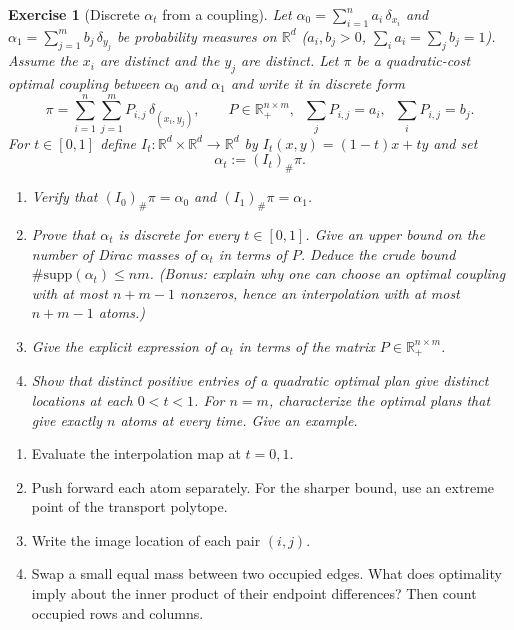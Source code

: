 \documentclass[11pt,a4paper]{article}
\theoremstyle{exostyle}
\newtheorem{exercise}{Exercise}
\newcommand{\R}{\mathbb{R}}
\newcommand{\push}{\#}
\begin{document}
\begin{exercise}[Discrete $\alpha_t$ from a coupling]\label{ex:discrete-interp}
Let $\alpha_0=\sum_{i=1}^n a_i\,\delta_{x_i}$ and $\alpha_1=\sum_{j=1}^m b_j\,\delta_{y_j}$ be probability measures on $\R^d$ ($a_i,b_j>0$, $\sum_i a_i=\sum_j b_j=1$).
Assume the $x_i$ are distinct and the $y_j$ are distinct. Let $\pi$ be a quadratic-cost optimal coupling between $\alpha_0$ and $\alpha_1$ and write it in discrete form
\[
\pi=\sum_{i=1}^n\sum_{j=1}^m P_{i,j}\,\delta_{(x_i,y_j)},\qquad
P\in\R^{n\times m}_+,\;\; \sum_j P_{i,j}=a_i,\;\; \sum_i P_{i,j}=b_j.
\]
For $t\in[0,1]$ define $I_t:\R^d\times\R^d\to\R^d$ by $I_t(x,y)=(1-t)x+ty$ and set
\[
\alpha_t:=(I_t)_{\push}\pi.
\]
\begin{enumerate}[label=(\alph*), itemsep=4pt]
\item Verify that $(I_0)_{\push}\pi=\alpha_0$ and $(I_1)_{\push}\pi=\alpha_1$.
\item Prove that $\alpha_t$ is discrete for every $t\in[0,1]$. Give an upper bound on the number of Dirac masses of $\alpha_t$ in terms of $P$. Deduce the crude bound $\#\mathrm{supp}(\alpha_t)\le nm$. (Bonus: explain why one can choose an \emph{optimal} coupling with at most $n+m-1$ nonzeros, hence an interpolation with at most $n+m-1$ atoms.)
\item Give the explicit expression of $\alpha_t$ in terms of the matrix $P\in\R^{n\times m}_+$.
\item Show that distinct positive entries of a quadratic optimal plan give distinct locations at each $0<t<1$. For $n=m$, characterize the optimal plans that give exactly $n$ atoms at every time. Give an example.
\end{enumerate}
\end{exercise}
\begin{hints}
\begin{enumerate}[label=(\alph*)]\item Evaluate the interpolation map at $t=0,1$.\item Push forward each atom separately. For the sharper bound, use an extreme point of the transport polytope.\item Write the image location of each pair $(i,j)$.\item Swap a small equal mass between two occupied edges. What does optimality imply about the inner product of their endpoint differences? Then count occupied rows and columns.\end{enumerate}
\end{hints}
\end{document}
